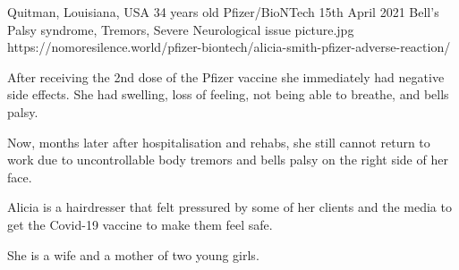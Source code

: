 {Quitman, Louisiana, USA}
{34 years old}
{Pfizer/BioNTech}
{15th April 2021}
{Bell's Palsy syndrome, Tremors, Severe Neurological issue}
{picture.jpg}
{https://nomoresilence.world/pfizer-biontech/alicia-smith-pfizer-adverse-reaction/}
{

After receiving the 2nd dose of the Pfizer vaccine she immediately had negative
side effects. She had swelling, loss of feeling, not being able to breathe, and
bells palsy.

Now, months later after hospitalisation and rehabs, she still cannot return to
work due to uncontrollable body tremors and bells palsy on the right side of her
face.

Alicia is a hairdresser that felt pressured by some of her clients and the media
to get the Covid-19 vaccine to make them feel safe.

She is a wife and a mother of two young girls.

}
